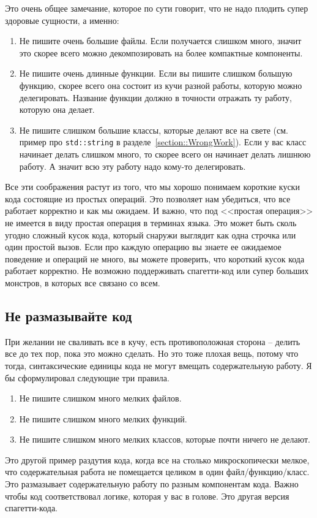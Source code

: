 Это очень общее замечание, которое по сути говорит, что не надо плодить супер здоровые сущности, а именно:
\begin{enumerate}
\item Не пишите очень большие файлы.
Если получается слишком много, значит это скорее всего можно декомпозировать на более компактные компоненты.

\item Не пишите очень длинные функции.
Если вы пишите слишком большую функцию, скорее всего она состоит из кучи разной работы, которую можно делегировать.
Название функции должно в точности отражать ту работу, которую она делает.

\item Не пишите слишком большие классы, которые делают все на свете (см. пример про \verb"std::string" в разделе~\ref{section::WrongWork}).
Если у вас класс начинает делать слишком много, то скорее всего он начинает делать лишнюю работу.
А значит всю эту работу надо кому-то делегировать.
\end{enumerate}
Все эти соображения растут из того, что мы хорошо понимаем короткие куски кода состоящие из простых операций.
Это позволяет нам убедиться, что все работает корректно и как мы ожидаем.
И важно, что под <<простая операция>> не имеется в виду простая операция в терминах языка.
Это может быть сколь угодно сложный кусок кода, который снаружи выглядит как одна строчка или один простой вызов.
Если про каждую операцию вы знаете ее ожидаемое поведение и операций не много, вы можете проверить, что короткий кусок кода работает корректно.
Не возможно поддерживать спагетти-код или супер больших монстров, в которых все связано со всем.

\subsection{Не размазывайте код}

При желании не сваливать все в кучу, есть противоположная сторона -- делить все до тех пор, пока это можно сделать.
Но это тоже плохая вещь, потому что тогда, синтаксические единицы кода не могут вмещать содержательную работу.
Я бы сформулировал следующие три правила.
\begin{enumerate}
\item Не пишите слишком много мелких файлов.

\item Не пишите слишком много мелких функций.

\item Не пишите слишком много мелких классов, которые почти ничего не делают.
\end{enumerate}
Это другой пример раздутия кода, когда все на столько микроскопически мелкое, что содержательная работа не помещается целиком в один файл/функцию/класс.
Это размазывает содержательную работу по разным компонентам кода.
Важно чтобы код соответствовал логике, которая у вас в голове.
Это другая версия спагетти-кода.

